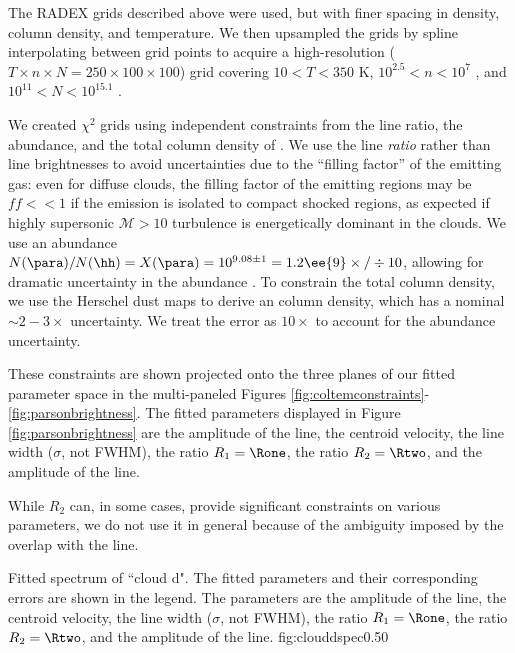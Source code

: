 The RADEX grids described above were used, but with finer spacing in density,
column density, and temperature.  We then upsampled the grids by spline
interpolating between grid points to acquire a high-resolution ($T\times n
\times N = 250\times100\times100$) grid
covering $10<T<350$ K, $10^{2.5} < n < 10^7$ \percc, and $10^{11} < N <
10^{15.1}$ \persc\perkmspc.

We created $\chi^2$ grids using independent constraints from the line ratio,
the \formaldehyde abundance, and the total column density of \hh.  We use the
line \emph{ratio} rather than line brightnesses to avoid uncertainties due to
the ``filling factor'' of the emitting gas: even for diffuse clouds, the
filling factor of the emitting regions may be $ff<<1$ if the emission is
isolated to compact shocked regions, as expected if highly supersonic
$\mathcal{M}>10$ turbulence is energetically dominant in the clouds.  We use an
abundance $N(\para)/N(\hh) = X(\para) = 10^{9.08\pm1} = 1.2\ee{9} \times/\div
10$, allowing for dramatic uncertainty in the \formaldehyde abundance
\citep{Ginsburg2013a,Carey1998a,Wootten1978a,Mundy1987a}.  To constrain the
total column density, we use the Herschel dust maps to derive an \hh column
density, which has a nominal $\sim2-3\times$ uncertainty.  We treat the error as
$10\times$ to account for the abundance uncertainty.

These constraints are shown projected onto the three planes of our fitted
parameter space in the multi-paneled Figures
\ref{fig:coltemconstraints}-\ref{fig:parsonbrightness}.  The fitted parameters
displayed in Figure \ref{fig:parsonbrightness} are the amplitude of the
\formaldehyde \threeohthree line, the centroid velocity, the line width
($\sigma$, not FWHM), the ratio $R_1 = \Rone$,
the ratio $R_2 = \Rtwo$, and the amplitude of
the \methanol \fourtwotwo line.

While $R_2$ can, in some cases, provide significant constraints on various
parameters, we do not use it in general because of the ambiguity imposed by the
overlap with the \methanol \fourtwotwo line.

{Fitted spectrum of ``cloud d".  The fitted parameters and their corresponding
errors are shown in the legend.  The parameters are the amplitude of the
\formaldehyde \threeohthree line, the centroid velocity, the line width
($\sigma$, not FWHM), the ratio $R_1 = \Rone$,
the ratio $R_2 = \Rtwo$, and the amplitude of
the \methanol \fourtwotwo line.  }
{fig:clouddspec}{0.5}{0}

